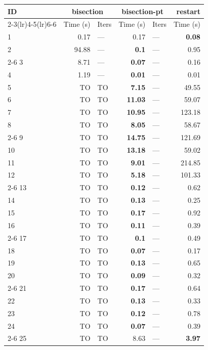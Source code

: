 \begin{longtable}{lr@{\hskip 4pt}l@{\hskip 12pt}r@{\hskip 4pt}l@{\hskip 12pt}r}
\toprule
ID & \multicolumn{2}{c}{bisection} & \multicolumn{2}{c}{bisection-pt} & restart \\
\cmidrule(lr){2-3}\cmidrule(lr){4-5}\cmidrule(lr){6-6}
 & Time (s) &  Iters & Time (s) &  Iters & Time (s) \\
\midrule
\endhead
1 & 0.17 & --- & 0.17 & --- & \textbf{0.08} \\
2 & 94.88 & --- & \textbf{0.1} & --- & 0.95 \\
\cmidrule{2-6}
3 & 8.71 & --- & \textbf{0.07} & --- & 0.16 \\
4 & 1.19 & --- & \textbf{0.01} & --- & 0.01 \\
\midrule
5 & TO & TO & \textbf{7.15} & --- & 49.55 \\
6 & TO & TO & \textbf{11.03} & --- & 59.07 \\
7 & TO & TO & \textbf{10.95} & --- & 123.18 \\
8 & TO & TO & \textbf{8.05} & --- & 58.67 \\
\cmidrule{2-6}
9 & TO & TO & \textbf{14.75} & --- & 121.69 \\
10 & TO & TO & \textbf{13.18} & --- & 59.02 \\
11 & TO & TO & \textbf{9.01} & --- & 214.85 \\
12 & TO & TO & \textbf{5.18} & --- & 101.33 \\
\cmidrule{2-6}
13 & TO & TO & \textbf{0.12} & --- & 0.62 \\
14 & TO & TO & \textbf{0.13} & --- & 0.25 \\
15 & TO & TO & \textbf{0.17} & --- & 0.92 \\
16 & TO & TO & \textbf{0.11} & --- & 0.39 \\
\cmidrule{2-6}
17 & TO & TO & \textbf{0.1} & --- & 0.49 \\
18 & TO & TO & \textbf{0.07} & --- & 0.17 \\
19 & TO & TO & \textbf{0.13} & --- & 0.65 \\
20 & TO & TO & \textbf{0.09} & --- & 0.32 \\
\cmidrule{2-6}
21 & TO & TO & \textbf{0.17} & --- & 0.64 \\
22 & TO & TO & \textbf{0.13} & --- & 0.33 \\
23 & TO & TO & \textbf{0.12} & --- & 0.78 \\
24 & TO & TO & \textbf{0.07} & --- & 0.39 \\
\cmidrule{2-6}
25 & TO & TO & 8.63 & --- & \textbf{3.97} \\

\end{longtable}
